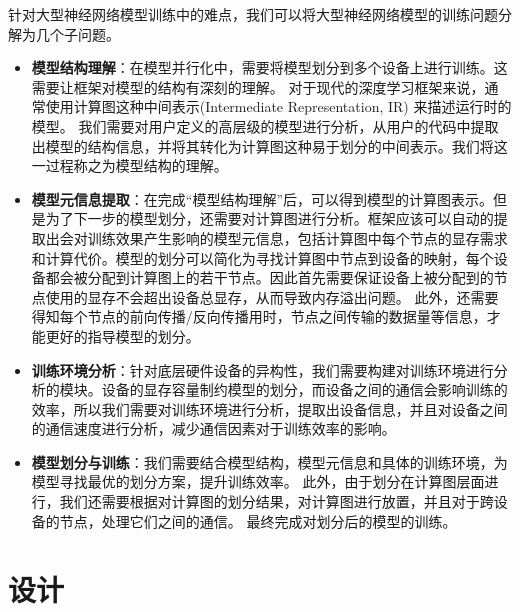 针对大型神经网络模型训练中的难点，我们可以将大型神经网络模型的训练问题分解为几个子问题。
\begin{itemize}
	\item \textbf{模型结构理解}：在模型并行化中，需要将模型划分到多个设备上进行训练。这需要让框架对模型的结构有深刻的理解。
	对于现代的深度学习框架来说，通常使用计算图这种中间表示(Intermediate Representation, IR) 来描述运行时的模型。
	我们需要对用户定义的高层级的模型进行分析，从用户的代码中提取出模型的结构信息，并将其转化为计算图这种易于划分的中间表示。我们将这一过程称之为模型结构的理解。
	\item \textbf{模型元信息提取}：在完成“模型结构理解”后，可以得到模型的计算图表示。但是为了下一步的模型划分，还需要对计算图进行分析。框架应该可以自动的提取出会对训练效果产生影响的模型元信息，包括计算图中每个节点的显存需求和计算代价。模型的划分可以简化为寻找计算图中节点到设备的映射，每个设备都会被分配到计算图上的若干节点。因此首先需要保证设备上被分配到的节点使用的显存不会超出设备总显存，从而导致内存溢出问题。
	此外，还需要得知每个节点的前向传播/反向传播用时，节点之间传输的数据量等信息，才能更好的指导模型的划分。
	\item \textbf{训练环境分析}：针对底层硬件设备的异构性，我们需要构建对训练环境进行分析的模块。设备的显存容量制约模型的划分，而设备之间的通信会影响训练的效率，所以我们需要对训练环境进行分析，提取出设备信息，并且对设备之间的通信速度进行分析，减少通信因素对于训练效率的影响。
	\item \textbf{模型划分与训练}：我们需要结合模型结构，模型元信息和具体的训练环境，为模型寻找最优的划分方案，提升训练效率。
	此外，由于划分在计算图层面进行，我们还需要根据对计算图的划分结果，对计算图进行放置，并且对于跨设备的节点，处理它们之间的通信。
	最终完成对划分后的模型的训练。
\end{itemize}

\section{\sys{} 设计}
\label{sec:design}

